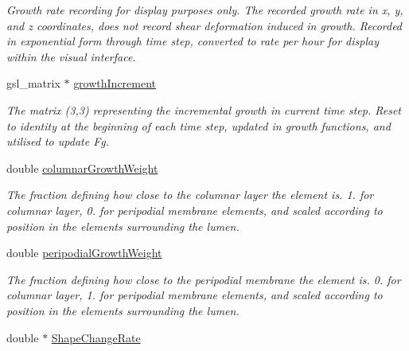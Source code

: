 \begin{DoxyCompactItemize}
\begin{DoxyCompactList}\small\item\em Growth rate recording for display purposes only. The recorded growth rate in x, y, and z coordinates, does not record shear deformation induced in growth. Recorded in exponential form through time step, converted to rate per hour for display within the visual interface. \end{DoxyCompactList}\item 
\hypertarget{classShapeBase_af553856335d7344ea67ab10f9cc3babf}{}gsl\+\_\+matrix $\ast$ \hyperlink{classShapeBase_af553856335d7344ea67ab10f9cc3babf}{growth\+Increment}\label{classShapeBase_af553856335d7344ea67ab10f9cc3babf}

\begin{DoxyCompactList}\small\item\em The matrix (3,3) representing the incremental growth in current time step. Reset to identity at the beginning of each time step, updated in growth functions, and utilised to update Fg. \end{DoxyCompactList}\item 
\hypertarget{classShapeBase_a134d82ba500ef829b6aa3e3a83783c9a}{}double \hyperlink{classShapeBase_a134d82ba500ef829b6aa3e3a83783c9a}{columnar\+Growth\+Weight}\label{classShapeBase_a134d82ba500ef829b6aa3e3a83783c9a}

\begin{DoxyCompactList}\small\item\em The fraction defining how close to the columnar layer the element is. 1. for columnar layer, 0. for peripodial membrane elements, and scaled according to position in the elements surrounding the lumen. \end{DoxyCompactList}\item 
\hypertarget{classShapeBase_a3663f3220016756b1bd5a92477325ec2}{}double \hyperlink{classShapeBase_a3663f3220016756b1bd5a92477325ec2}{peripodial\+Growth\+Weight}\label{classShapeBase_a3663f3220016756b1bd5a92477325ec2}

\begin{DoxyCompactList}\small\item\em The fraction defining how close to the peripodial membrane the element is. 0. for columnar layer, 1. for peripodial membrane elements, and scaled according to position in the elements surrounding the lumen. \end{DoxyCompactList}\item 
\hypertarget{classShapeBase_a1c6db43b0794a15e4bc42b8ca994a785}{}double $\ast$ \hyperlink{classShapeBase_a1c6db43b0794a15e4bc42b8ca994a785}{Shape\+Change\+Rate}\label{classShapeBase_a1c6db43b0794a15e4bc42b8ca994a785}


\end{DoxyCompactItemize}
